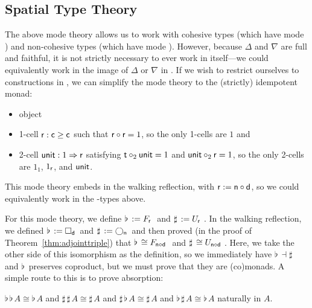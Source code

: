 \documentclass{drl-common/llncs}
\newcommand{\la}{\ensuremath{\dashv}}
\newcommand{\tc}[2]{\ensuremath{#1 \Rightarrow #2}}
\newcommand\compo[2]{\ensuremath{#1 \circ #2}}
\newcommand\comph[2]{\ensuremath{#1 \mathbin{\circ_2} #2}}
\newcommand\F[2]{\ensuremath{F_{#1} \,\, #2}}
\newcommand\U[2]{\ensuremath{U_{#1} \,\, #2}}
\newcommand\Bx[2]{\ensuremath{\Box_{#1} \, {#2}}}
\newcommand\Crc[2]{\ensuremath{\bigcirc_{#1} \, {#2}}}
\newcommand\Flat[1]{\ensuremath{\flat \, {#1}}}
\newcommand\Sharp[1]{\ensuremath{\sharp \, {#1}}}
\newcommand\iso{\cong}
\begin{document}

\subsection{Spatial Type Theory}
\label{sec:idempotent}

The above mode theory allows us to work with cohesive types (which have
mode ) and non-cohesive types (which have mode ).
However, because $\Delta$ and $\nabla$ are full and faithful, it is not
strictly necessary to ever work in  itself---we could
equivalently work in the image of $\Delta$ or $\nabla$ in .  If
we wish to restrict ourselves to constructions in , we can
simplify the mode theory to the (strictly) idempotent monad:
\begin{itemize}
\item object 
\item 1-cell $\mathsf{r} : \mathsf{c} \ge \mathsf{c}$ such that
  $\compo{\dsd{r}}{\dsd{r}} = 1$, so the only 1-cells are $1$ and 
\item 2-cell $\dsd{unit} : \tc{1}{\dsd{r}}$ satisfying $\comph{\dsd
  t}{\dsd{unit}} = 1$ and $\comph{\dsd{unit}}{\dsd{r}} = 1$, so 
  the only 2-cells are $1_1$, $1_{\mathsf{r}}$, and  $\mathsf{unit}$. 
\end{itemize}
This mode theory embeds in the walking reflection, with $\dsd{r} :=
\compo{\dsd{n}}{\dsd{d}}$, so we could equivalently work in the
-types above.

For this mode theory, we define $\Flat{} := \F{\dsd{r}}{}$ and $\Sharp{}
:= \U{\dsd{r}}{}$.  In the walking reflection, we defined $\Flat{} :=
\Bx{\dsd{d}}{}$ and $\Sharp{} := \Crc{\dsd{n}}{}$ and then proved (in
the proof of Theorem~\ref{thm:adjointtriple}) that $\Flat{} \iso
\F{\compo{\dsd n}{\dsd d}}$ and $\Sharp{} \iso \U{\compo{\dsd n}{\dsd
    d}}$. Here, we take the other side of this isomorphism as the
definition, so we immediately have $\Flat{} \la \Sharp{}$ and $\Flat{}$
preserves coproduct, but we must prove that they are (co)monads.  A
simple route to this is to prove absorption:

\begin{theorem}
 $\Flat{\Flat A} \iso \Flat A$ and $\Sharp{\Sharp A} \iso \Sharp A$
and $\Sharp{\Flat A} \iso \Sharp{A}$ 
and $\Flat{\Sharp A} \iso \Flat{A}$ naturally in $A$.
\end{theorem}
\end{document}
